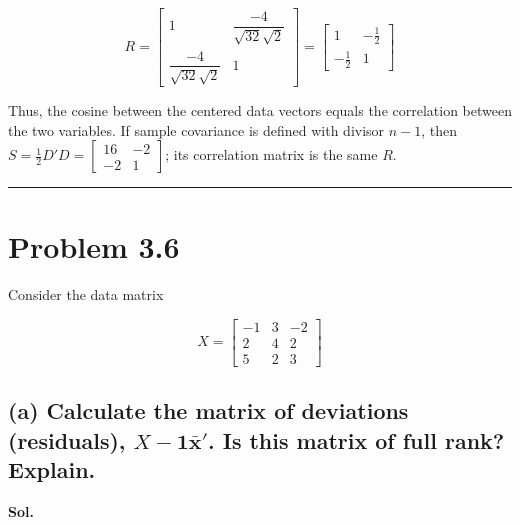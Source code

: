 \documentclass[12pt]{article}
\begin{document}
\vspace{0.2cm}

\[
R=\begin{bmatrix}
1&\dfrac{-4}{\sqrt{32}\sqrt{2}}\\
\dfrac{-4}{\sqrt{32}\sqrt{2}}&1
\end{bmatrix}
=\boxed{\begin{bmatrix}1&-\frac12\\-\frac12&1\end{bmatrix}}
\]

\vspace{0.2cm}

Thus, the cosine between the centered data vectors equals the correlation between the two variables. If sample covariance is defined with divisor $n-1$, then
$S=\frac12D'D=\begin{bmatrix}16&-2\\-2&1\end{bmatrix}$; its correlation matrix is the same $R$.

\vspace{0.7cm}
\hrule
\vspace{0.7cm}

\section*{Problem 3.6}

\vspace{0.2cm}

Consider the data matrix

\vspace{0.2cm}

\[
X=\begin{bmatrix}
-1&3&-2\\
2&4&2\\
5&2&3
\end{bmatrix}
\]

\vspace{0.2cm}

\subsection*{(a) Calculate the matrix of deviations (residuals), $X-\boldsymbol{1}\bar{\boldsymbol{x}}'$. Is this matrix of full rank? Explain.}

\vspace{0.2cm}

\textbf{Sol.}

\vspace{0.2cm}
\end{document}
